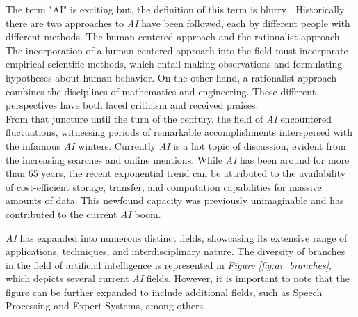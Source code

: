 The term "AI" is exciting but, the definition of this term is blurry \cite{AIModernApprouch}. Historically there are two approaches to \textit{AI} have been followed, each by different people
with different methods. The human-centered approach and the rationalist approach. The incorporation of a human-centered approach into the field must incorporate empirical scientific methods, which entail making observations and formulating hypotheses about human behavior. On the other hand, a rationalist approach combines the disciplines of mathematics and engineering. These different perspectives have both faced criticism and received praises. \\

From that juncture until the turn of the century, the field of \textit{AI} encountered fluctuations, witnessing periods of remarkable accomplishments interspersed with the infamous \textit{AI} winters. Currently \textit{AI} is a hot topic of discussion, evident from the increasing searches and online mentions. While \textit{AI} has been around for more than 65 years, the recent exponential trend can be attributed to the availability of cost-efficient storage, transfer, and computation capabilities for massive amounts of data. This newfound capacity was previously unimaginable and has contributed to the current \textit{AI} boom. \\

\newpage

\textit{AI} has expanded into numerous distinct fields, showcasing its extensive range of applications, techniques, and interdisciplinary nature. The diversity of branches in the field of artificial intelligence is represented in \textit{Figure \ref{fig:ai_branches}}, which depicts several current \textit{AI} fields. However, it is important to note that the figure can be further expanded to include additional fields, such as Speech Processing and Expert Systems, among others.

